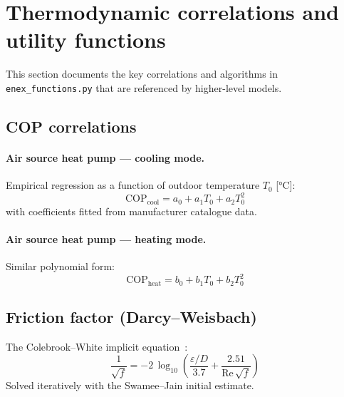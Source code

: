 \section{Thermodynamic correlations and utility functions}
\label{sec:enex-functions}

This section documents the key correlations and algorithms in \texttt{enex\_functions.py} that are referenced by higher-level models.

\subsection{COP correlations}

\paragraph{Air source heat pump --- cooling mode.}
Empirical regression as a function of outdoor temperature $T_0$ [°C]:
\begin{equation}\label{eq:cop-ashp-cool}
  \text{COP}_\text{cool} = a_0 + a_1 T_0 + a_2 T_0^2
\end{equation}
with coefficients fitted from manufacturer catalogue data.

\paragraph{Air source heat pump --- heating mode.}
Similar polynomial form:
\begin{equation}\label{eq:cop-ashp-heat}
  \text{COP}_\text{heat} = b_0 + b_1 T_0 + b_2 T_0^2
\end{equation}



\subsection{Friction factor (Darcy--Weisbach)}

The Colebrook--White implicit equation~\cite{colebrook1939}:
\begin{equation}\label{eq:colebrook}
  \frac{1}{\sqrt{f}} = -2\,\log_{10}\!\left(\frac{\varepsilon/D}{3.7} + \frac{2.51}{\text{Re}\,\sqrt{f}}\right)
\end{equation}
Solved iteratively with the Swamee--Jain initial estimate.

